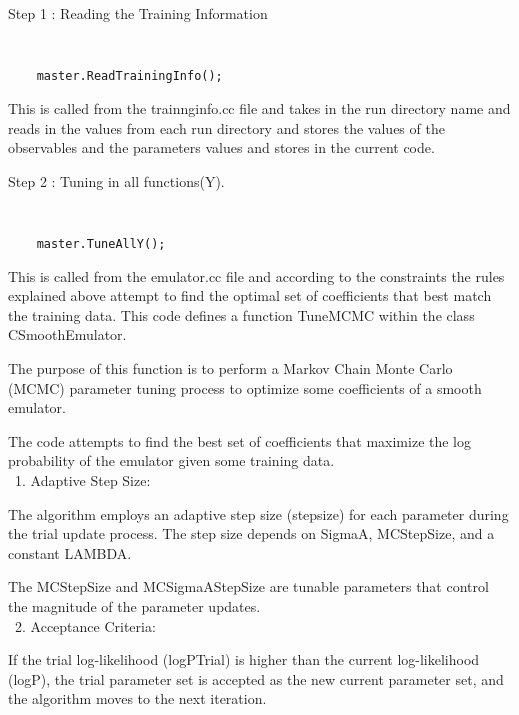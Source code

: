\documentclass[12pt]{article}
\numberwithin{equation}{section}
\numberwithin{figure}{section}
\begin{document}
\begin{description}
\item[Step 1 : Reading the Training Information]
\end{description}

{\tt 
\begin{verbatim}
    master.ReadTrainingInfo(); 
\end{verbatim}
}

This is called from the trainnginfo.cc file and takes in the run directory name and reads in the values from each run directory and stores the values of the observables and the parameters values and stores in the current code. 

\begin{description}
\item[Step 2 : Tuning in all functions(Y). ]
\end{description}

{\tt 
\begin{verbatim}
    master.TuneAllY(); 
\end{verbatim}
}

This is called from the emulator.cc file and according to the constraints the rules explained above attempt to find the optimal set of coefficients that best match the training data. This code defines a function TuneMCMC within the class CSmoothEmulator.

The purpose of this function is to perform a Markov Chain Monte Carlo (MCMC) parameter tuning process to optimize some coefficients of a smooth emulator. 

The code attempts to find the best set of coefficients that maximize the log probability of the emulator given some training data. \\

\ 1. Adaptive Step Size:

The algorithm employs an adaptive step size (stepsize) for each parameter during the trial update process. The step size depends on SigmaA, MCStepSize, and a constant LAMBDA.

The MCStepSize and MCSigmaAStepSize are tunable parameters that control the magnitude of the parameter updates. \\

\ 2. Acceptance Criteria:

If the trial log-likelihood (logPTrial) is higher than the current log-likelihood (logP), the trial parameter set is accepted as the new current parameter set, and the algorithm moves to the next iteration.
\end{document}
